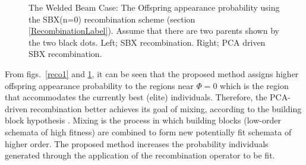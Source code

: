 \begin{figure}[h!]
\begin{minipage}[b]{0.5\linewidth}
 \centering
\end{minipage}
\begin{minipage}[b]{0.5\linewidth}
 \centering
\end{minipage}
\caption{The Welded Beam Case: The  Offspring appearance probability using the SBX(n=0) recombination scheme (section \ref{RecombinationLabel}). Assume that there are two  parents shown by the two black dots. Left; SBX recombination. Right; PCA driven SBX recombination.} 
\label{reco2}
\end{figure}

From figs.\ \ref{reco1} and \ref{reco2}, it can be seen that the proposed method assigns higher offspring appearance probability to the regions near $\Phi\!=\!0$ which is the region that accommodates the currently best (elite) individuals. Therefore, the PCA-driven recombination  better achieves its goal of mixing, according to the building block hypothesis \cite{Gold89}. Mixing is the process in which building blocks (low-order schemata of high fitness) are combined to form new potentially fit schemata of higher order. The proposed method increases the probability individuals generated through the application of the recombination operator to be fit.   

